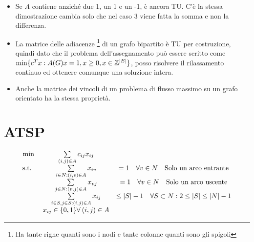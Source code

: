 \begin{itemize}
	\item Se $A$ contiene anziché due 1, un 1 e un -1, è ancora TU. C'è la stessa dimostrazione cambia solo che nel caso 3 viene fatta la somma e non la differenza.
	\item La matrice delle adiacenze \footnote{Ha tante righe quanti sono i nodi e tante colonne quanti sono gli spigoli} di un grafo bipartito è TU per costruzione, quindi dato che il problema dell'assegnamento può essere scritto come $\min \{ c^Tx : A(G)x = 1, x \geq 0, x \in \mathbb{Z}^{|E|} \}$, posso risolvere il rilassamento continuo ed ottenere comunque una soluzione intera.
	\item Anche la matrice dei vincoli di un problema di flusso massimo su un grafo orientato ha la stessa proprietà.
	
\end{itemize}


\section{ATSP}

$$
\begin{matrix}
	\min \: & \sum\limits_{(i,j) \in A} c_{ij}x_{ij} & \\
	\text{s.t. } \: & \sum\limits_{i \in N : (i,v) \in A} x_{iv} &=1 \quad \forall v \in N  \quad \text{Solo un arco entrante}\\
	       & \sum\limits_{j \in N : (v,j) \in A} x_{vj} &=1 \quad \forall v \in N  \quad \text{Solo un arco uscente}\\
	       & \sum\limits_{i \in S, j \in S: (i,j) \in A} x_{ij} &\leq |S|-1 \quad \forall S \subset N : 2 \leq |S| \leq |N|-1 \\
	       & x_{ij} \in \{0,1\} \forall \: (i,j) \in A
\end{matrix}
$$


